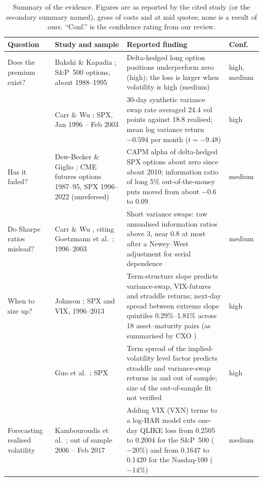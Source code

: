 \documentclass[10pt, a4paper, twocolumn]{article}
\renewcommand{\toprule}{\arrayrulecolor{qnavy}\specialrule{\heavyrulewidth}{\abovetopsep}{\belowrulesep}\arrayrulecolor{black}}
\newcommand{\qstripes}{\rowcolors{2}{qstripe}{white}}
\newcommand{\qhead}[1]{\textbf{\color{qnavy}#1}}
\begin{document}
\begin{table}[t]
\centering
\caption{Summary of the evidence. Figures are as reported by the cited study (or the secondary summary named), gross of costs and at mid quotes; none is a result of ours. ``Conf.'' is the confidence rating from our review.}
\label{tab:evidence}
\small
\qstripes
\begin{tabularx}{\textwidth}{@{}L{2.2cm}L{3.7cm}Y L{1.3cm}@{}}
\toprule
\qhead{Question} & \qhead{Study and sample} & \qhead{Reported finding} & \qhead{Conf.} \\
\midrule
Does the premium exist? & Bakshi \& Kapadia \cite{bakshi2003}; S\&P~500 options, about 1988--1995 & Delta-hedged long option positions underperform zero (high); the loss is larger when volatility is high (medium) & high, medium \\
 & Carr \& Wu \cite{carrwu2009}; SPX, Jan 1996 -- Feb 2003 & 30-day synthetic variance swap rate averaged 24.4 vol points against 18.8 realised; mean log variance return $-0.594$ per month ($t=-9.48$) & high \\
Has it faded? & Dew-Becker \& Giglio \cite{dewbecker2025}; CME futures options 1987--95, SPX 1996--2022 (unrefereed) & CAPM alpha of delta-hedged SPX options about zero since about 2010; information ratio of long 5\% out-of-the-money puts moved from about $-0.6$ to $0.09$ & medium \\
Do Sharpe ratios mislead? & Carr \& Wu \cite{carrwu2009}, citing Goetzmann et al.\ \cite{goetzmann2002}; 1996--2003 & Short variance swaps: raw annualised information ratios above 3, near 0.8 at most after a Newey--West adjustment for serial dependence & medium \\
When to size up? & Johnson \cite{johnson2017}; SPX and VIX, 1996--2013 & Term-structure slope predicts variance-swap, VIX-futures and straddle returns; next-day spread between extreme slope quintiles 0.29\%--1.81\% across 18 asset--maturity pairs (as summarised by CXO \cite{cxo}) & high \\
 & Guo et al.\ \cite{guo2023}; SPX & Term spread of the implied-volatility level factor predicts straddle and variance-swap returns in and out of sample; size of the out-of-sample fit not verified & high \\
Forecasting realised volatility & Kambouroudis et al.\ \cite{kambouroudis2021}; out of sample 2006 -- Feb 2017 & Adding VIX (VXN) terms to a log-HAR model cuts one-day QLIKE loss from 0.2505 to 0.2004 for the S\&P~500 ($-20\%$) and from 0.1647 to 0.1420 for the Nasdaq-100 ($-14\%$) & medium \\

\end{tabularx}
\end{table}
\end{document}
